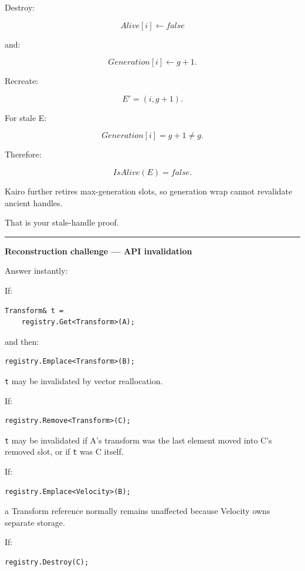 Destroy:

\[
Alive[i]\leftarrow false
\]

and:

\[
Generation[i]\leftarrow g+1.
\]

Recreate:

\[
E'=(i,g+1).
\]

For stale E:

\[
Generation[i]=g+1\neq g.
\]

Therefore:

\[
IsAlive(E)=false.
\]

Kairo further retires max-generation slots, so generation wrap cannot revalidate ancient handles.

That is your stale-handle proof.

\begin{center}\rule{0.5\linewidth}{0.5pt}\end{center}

\textbf{Reconstruction challenge --- API invalidation}

Answer instantly:

If:

\begin{verbatim}
Transform& t =
    registry.Get<Transform>(A);
\end{verbatim}

and then:

\begin{verbatim}
registry.Emplace<Transform>(B);
\end{verbatim}

\texttt{t} may be invalidated by vector reallocation.

If:

\begin{verbatim}
registry.Remove<Transform>(C);
\end{verbatim}

\texttt{t} may be invalidated if A's transform was the last element moved into C's removed slot, or if \texttt{t} was C itself.

If:

\begin{verbatim}
registry.Emplace<Velocity>(B);
\end{verbatim}

a Transform reference normally remains unaffected because Velocity owns separate storage.

If:

\begin{verbatim}
registry.Destroy(C);
\end{verbatim}

